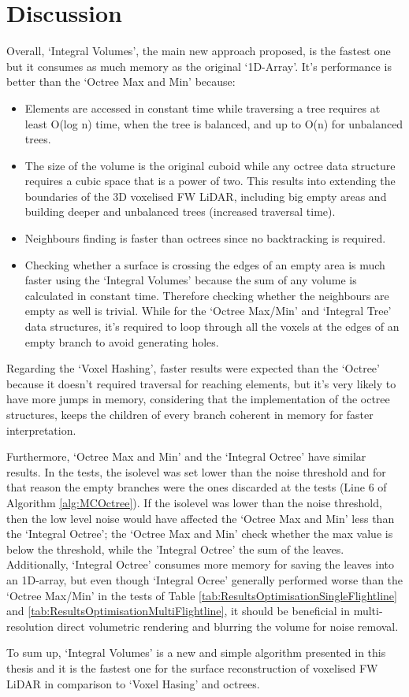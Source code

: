 \documentclass{subfiles}
\begin{document}
\section{Discussion}\label{sec:Opt:Discussion}

\par Overall, `Integral Volumes', the main new approach proposed, is the fastest one but it consumes as much memory as the original `1D-Array'. It's performance is better than the `Octree Max and Min' because:

\begin{itemize}
	\item Elements are accessed in constant time while traversing a tree requires at least O(log n) time, when the tree is balanced, and up to O(n) for unbalanced trees.
	\item The size of the volume is the original cuboid while any octree data structure requires a cubic space that is a power of two. This results into extending the boundaries of the 3D voxelised FW LiDAR, including big empty areas and building deeper and unbalanced trees (increased traversal time).
	\item Neighbours finding is faster than octrees since no backtracking is required. 
	\item Checking whether a surface is crossing the edges of an empty area is much faster using the `Integral Volumes' because the sum of any volume is calculated in constant time. Therefore checking whether the neighbours are empty as well is trivial. While for the `Octree Max/Min' and `Integral Tree' data structures, it's required to loop through all the voxels at the edges of an empty branch to avoid generating holes. 
\end{itemize}

\par Regarding the `Voxel Hashing', faster results were expected than the `Octree' because it doesn't required traversal for reaching elements, but it's very likely to have more jumps in memory, considering that the implementation of the octree structures, keeps the children of every branch coherent in memory for faster interpretation. 

\par Furthermore, `Octree Max and Min' and the `Integral Octree' have similar results. In the tests, the isolevel was set lower than the noise threshold and for that reason the empty branches were the ones discarded at the tests (Line 6 of Algorithm \ref{alg:MCOctree}). If the isolevel was lower than the noise threshold, then the low level noise would have affected the `Octree Max and Min' less than the `Integral Octree'; the `Octree Max and Min' check whether the max value is below the threshold, while the 'Integral Octree' the sum of the leaves. Additionally, `Integral Octree' consumes more memory for saving the leaves into an 1D-array, but even though `Integral Ocree' generally performed worse than the `Octree Max/Min' in the tests of Table \ref{tab:ResultsOptimisationSingleFlightline} and \ref{tab:ResultsOptimisationMultiFlightline}, it should be beneficial in multi-resolution direct volumetric rendering and blurring the volume for noise removal. 

\par To sum up, `Integral Volumes' is a new and simple algorithm presented in this thesis and it is the fastest one for the surface reconstruction of voxelised FW LiDAR in comparison to `Voxel Hasing' and octrees. 
\end{document}
